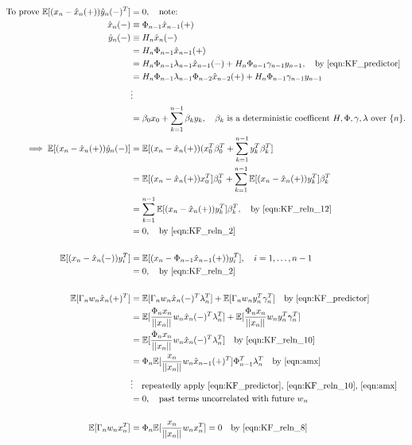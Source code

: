 \begin{align}
\text{To prove } \mathbb{E}[(x_n - \hat{x}_{n}(+))\hat{y}_n(-)^T] &=0, \quad \text{note:} \\
\hat{x}_{n}(-) & \equiv \Phi_{n-1} \hat{x}_{n-1}(+) \label{eqn:amx}\\
\hat{y}_n(-) & \equiv H_n \hat{x}_{n}(-) \\
&= H_n \Phi_{n-1} \hat{x}_{n-1}(+) \\
&= H_n \Phi_{n-1} \lambda_{n-1} \hat{x}_{n-1}(-) + H_n \Phi_{n-1} \gamma_{n-1} y_{n-1}, \quad \text{by \ref{eqn:KF_predictor}} \\
&= H_n \Phi_{n-1} \lambda_{n-1} \Phi_{n-2} \hat{x}_{n-2}(+) + H_n \Phi_{n-1} \gamma_{n-1} y_{n-1} \\
&\vdots \nonumber \\
& = \beta_0 x_0 + \sum_{k=1}^{n-1} \beta_k y_k, \quad \text{$\beta_k$ is a deterministic coefficent $H, \Phi, \gamma, \lambda$ over $\{n\}$.}\\
\implies \mathbb{E}[(x_n - \hat{x}_{n}(+))\hat{y}_n(-)] &= \mathbb{E}[(x_n - \hat{x}_{n}(+))(x_0^T\beta_0^T  + \sum_{k=1}^{n-1} y_k^T \beta_k^T ] \\
&= \mathbb{E}[(x_n - \hat{x}_{n}(+))x_0^T]\beta_0^T  + \sum_{k=1}^{n-1} \mathbb{E}[(x_n - \hat{x}_{n}(+))y_k^T] \beta_k^T  \\
&= \sum_{k=1}^{n-1} \mathbb{E}[(x_n - \hat{x}_{n}(+))y_k^T] \beta_k^T, \quad \text{by \ref{eqn:KF_reln_12}}\\
&=0, \quad \text{by \ref{eqn:KF_reln_2}} \\
\nonumber \\ 
\mathbb{E}[(x_n - \hat{x}_{n}(-))y_i^T] &= \mathbb{E}[(x_n - \Phi_{n-1} \hat{x}_{n-1}(+))y_i^T], \quad i = 1,\dots,n-1 \\
&=0, \quad \text{by \ref{eqn:KF_reln_2}} \\
\nonumber \\
\mathbb{E}[\Gamma_n w_n \hat{x}_{n}(+)^T] &=\mathbb{E}[\Gamma_n w_n  \hat{x}_n(-)^T \lambda_n^T] +  \mathbb{E}[\Gamma_n w_n  y_n^T \gamma_n^T] \quad \text{by \ref{eqn:KF_predictor}}\\
&=\mathbb{E}[\frac{\Phi_{n}x_{n}}{||x_{n}||} w_n  \hat{x}_n(-)^T \lambda_n^T] +  \mathbb{E}[\frac{\Phi_{n}x_{n}}{||x_{n}||} w_n  y_n^T \gamma_n^T] \\
&=\mathbb{E}[\frac{\Phi_{n}x_{n}}{||x_{n}||} w_n  \hat{x}_n(-)^T \lambda_n^T] \quad \text{by \ref{eqn:KF_reln_10}} \\
&=\Phi_{n}\mathbb{E}[\frac{x_{n}}{||x_{n}||} w_n \hat{x}_{n-1}(+)^T] \Phi_{n-1}^T \lambda_n^T \quad \text{by \ref{eqn:amx}} \\
&\vdots \quad \text{repeatedly apply \ref{eqn:KF_predictor}, \ref{eqn:KF_reln_10}, \ref{eqn:amx}} \\
&=0, \quad \text{past terms uncorrelated with future $w_n$} \\
\nonumber \\ 
\mathbb{E}[\Gamma_n w_n x_n^T] &= \Phi_{n}\mathbb{E}[\frac{x_{n}}{||x_{n}||} w_n x_n^T] =0 \quad \text{by \ref{eqn:KF_reln_8} } 
\end{align}

